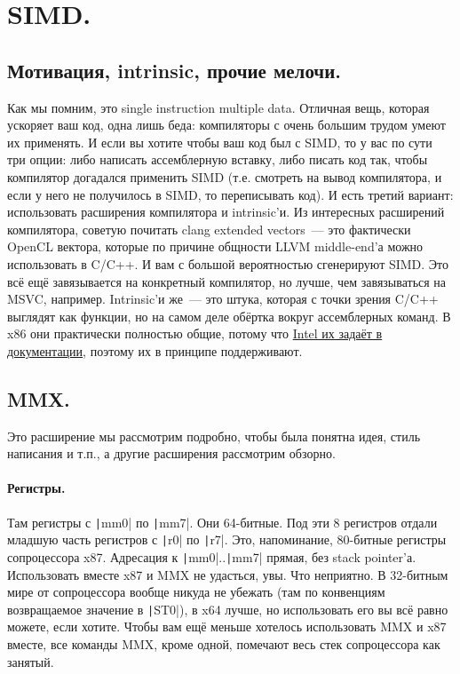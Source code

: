 \documentclass{article}
\begin{document}
    \section{SIMD.}
    \subsection{Мотивация, intrinsic, прочие мелочи.}
    Как мы помним, это single instruction multiple data. Отличная вещь, которая ускоряет ваш код, одна лишь беда: компиляторы с очень большим трудом умеют их применять. И если вы хотите чтобы ваш код был с SIMD, то у вас по сути три опции: либо написать ассемблерную вставку, либо писать код так, чтобы компилятор догадался применить SIMD (т.е. смотреть на вывод компилятора, и если у него не получилось в SIMD, то переписывать код). И есть третий вариант: использовать расширения компилятора и intrinsic'и. Из интересных расширений компилятора, советую почитать clang extended vectors~--- это фактически OpenCL вектора, которые по причине общности LLVM middle-end'а можно использовать в C/C++. И вам с большой вероятностью сгенерируют SIMD. Это всё ещё завязывается на конкретный компилятор, но лучше, чем завязываться на MSVC, например. Intrinsic'и же~--- это штука, которая с точки зрения C/C++ выглядят как функции, но на самом деле обёртка вокруг ассемблерных команд. В x86 они практически полностью общие, потому что \href{https://www.intel.com/content/www/us/en/docs/intrinsics-guide/index.html}{Intel их задаёт в документации}, поэтому их в принципе поддерживают.
    \subsection{MMX.}
    Это расширение мы рассмотрим подробно, чтобы была понятна идея, стиль написания и т.п., а другие расширения рассмотрим обзорно.
    \paragraph{Регистры.}
    Там регистры с \texttt|mm0| по \texttt|mm7|. Они 64-битные. Под эти 8 регистров отдали младшую часть регистров с \texttt|r0| по \texttt|r7|. Это, напоминание, 80-битные регистры сопроцессора x87. Адресация к \texttt|mm0|..\texttt|mm7| прямая, без stack pointer'а. Использовать вместе x87 и MMX не удасться, увы. Что неприятно. В 32-битным мире от сопроцессора вообще никуда не убежать (там по конвенциям возвращаемое значение в \texttt|ST0|), в x64 лучше, но использовать его вы всё равно можете, если хотите. Чтобы вам ещё меньше хотелось использовать MMX и x87 вместе, все команды MMX, кроме одной, помечают весь стек сопроцессора как занятый.
\end{document}
